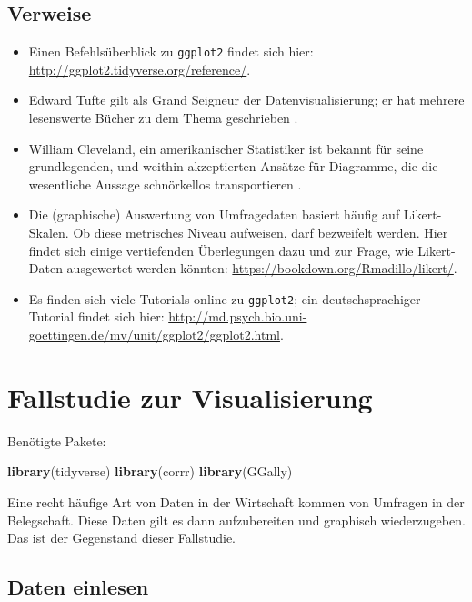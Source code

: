 \documentclass[12pt,ngerman,]{book}
\newenvironment{Shaded}{\begin{snugshade}}{\end{snugshade}}
\newcommand{\KeywordTok}[1]{\textcolor[rgb]{0.13,0.29,0.53}{\textbf{{#1}}}}
\newcommand{\NormalTok}[1]{{#1}}
\renewenvironment{Shaded}{\begin{kframe}}{\end{kframe}}
\begin{document}
\section{Verweise}\label{verweise-4}

\begin{itemize}
\item
  Einen Befehlsüberblick zu \texttt{ggplot2} findet sich hier:
  \url{http://ggplot2.tidyverse.org/reference/}.
\item
  Edward Tufte gilt als Grand Seigneur der Datenvisualisierung; er hat
  mehrere lesenswerte Bücher zu dem Thema geschrieben
  \citep{1930824130, 1930824165, 1930824149}.
\item
  William Cleveland, ein amerikanischer Statistiker ist bekannt für
  seine grundlegenden, und weithin akzeptierten Ansätze für Diagramme,
  die die wesentliche Aussage schnörkellos transportieren
  \citep{Cleveland}.
\item
  Die (graphische) Auswertung von Umfragedaten basiert häufig auf
  Likert-Skalen. Ob diese metrisches Niveau aufweisen, darf bezweifelt
  werden. Hier findet sich einige vertiefenden Überlegungen dazu und zur
  Frage, wie Likert-Daten ausgewertet werden könnten:
  \url{https://bookdown.org/Rmadillo/likert/}.
\item
  Es finden sich viele Tutorials online zu \texttt{ggplot2}; ein
  deutschsprachiger Tutorial findet sich hier:
  \url{http://md.psych.bio.uni-goettingen.de/mv/unit/ggplot2/ggplot2.html}.
\end{itemize}

\chapter{Fallstudie zur
Visualisierung}\label{fallstudie-zur-visualisierung}

Benötigte Pakete:

\begin{Shaded}
\begin{Highlighting}[]
\KeywordTok{library}\NormalTok{(tidyverse)}
\KeywordTok{library}\NormalTok{(corrr)}
\KeywordTok{library}\NormalTok{(GGally)}
\end{Highlighting}
\end{Shaded}

Eine recht häufige Art von Daten in der Wirtschaft kommen von Umfragen
in der Belegschaft. Diese Daten gilt es dann aufzubereiten und graphisch
wiederzugeben. Das ist der Gegenstand dieser Fallstudie.

\section{Daten einlesen}\label{daten-einlesen-1}
\end{document}
